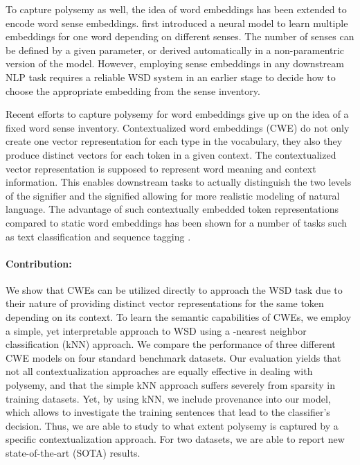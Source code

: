 \documentclass[11pt]{article}
\begin{document}
To capture polysemy as well, the idea of word embeddings has been extended to encode word sense embeddings.  first introduced a neural model to learn multiple embeddings for one word depending on different senses. The number of senses can be defined by a given parameter, or derived automatically in a non-paramentric version of the model. However, employing sense embeddings in any downstream NLP task requires a reliable WSD system in an earlier stage to decide how to choose the appropriate embedding from the sense inventory.

Recent efforts to capture polysemy for word embeddings give up on the idea of a fixed word sense inventory.
Contextualized word embeddings (CWE) do not only create one vector representation for each type in the vocabulary, they also they produce distinct vectors for each token in a given context.
The contextualized vector representation is supposed to represent word meaning and context information. 
This enables downstream tasks to actually distinguish the two levels of the signifier and the signified allowing for more realistic modeling of natural language.
The advantage of such contextually embedded token representations compared to static word embeddings has been shown for a number of tasks such as text classification \cite{zampieri.2019} and sequence tagging \cite{akbik.2018}.


\paragraph{Contribution:}We show that CWEs can be utilized directly to approach the WSD task due to their nature of providing distinct vector representations for the same token depending on its context.
To learn the semantic capabilities of CWEs, we employ a simple, yet interpretable approach to WSD using a -nearest neighbor classification (kNN) approach. 
We compare the performance of three different CWE models on four standard benchmark datasets.
Our evaluation yields that not all contextualization approaches are equally effective in dealing with polysemy, and that the simple kNN approach suffers severely from sparsity in training datasets.
Yet, by using kNN, we include provenance into our model, which allows to investigate the training sentences that lead to the classifier's decision. 
Thus, we are able to study to what extent polysemy is captured by a specific contextualization approach.
For two datasets, we are able to report new state-of-the-art (SOTA) results.
\end{document}
